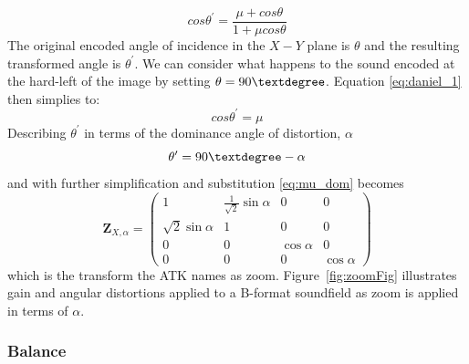 \documentclass[12pt]{article}
\begin{document}
\begin{equation}		\label{eq:daniel_1}
	cos\theta^\prime = \frac{\mu + cos\theta}{1 +\mu cos\theta}
\end{equation}The original encoded angle of incidence in the \(X-Y\) plane is \(\theta\) and the resulting transformed angle is \(\theta^\prime\). We can consider what happens to the sound encoded at the hard-left of the image by setting \(\theta = 90\textdegree\). Equation \eqref{eq:daniel_1} then simplies to: \begin{equation}		\label{eq:daniel_2}
	cos\theta^\prime = \mu
\end{equation} Describing \(\theta^\prime\) in terms of the dominance angle of distortion, \(\alpha\) \begin{equation}
	\theta^\prime = 90\textdegree - \alpha
\end{equation} and with further simplification and substitution \eqref{eq:mu_dom} becomes\begin{equation}	\label{eq:zoom}
\mathbf{Z}_{X, \alpha} = \begin{pmatrix}
	1 & \frac{1}{\sqrt{2}}\sin{\alpha} & 0 & 0\\
	\sqrt{2}\sin{\alpha} & 1 & 0 & 0\\
	0 & 0 & \cos{\alpha} & 0\\
	0 & 0 & 0 & \cos{\alpha}
\end{pmatrix}
\end{equation} which is the transform the ATK names as zoom. Figure~\ref{fig:zoomFig} illustrates gain and angular distortions applied to a B-format soundfield as zoom is applied in terms of \(\alpha\). 

\subsubsection{Balance}
\end{document}

